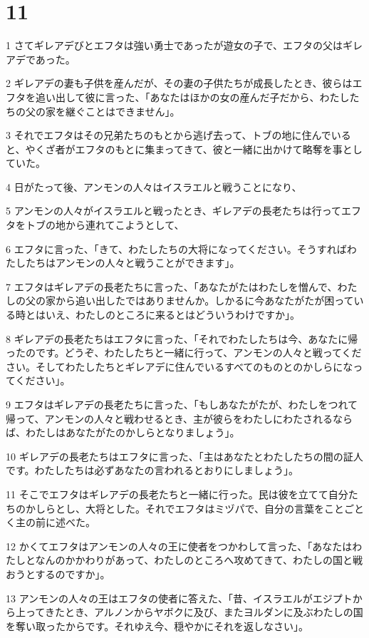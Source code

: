 \chapter{11}

\par 1 さてギレアデびとエフタは強い勇士であったが遊女の子で、エフタの父はギレアデであった。
\par 2 ギレアデの妻も子供を産んだが、その妻の子供たちが成長したとき、彼らはエフタを追い出して彼に言った、「あなたはほかの女の産んだ子だから、わたしたちの父の家を継ぐことはできません」。
\par 3 それでエフタはその兄弟たちのもとから逃げ去って、トブの地に住んでいると、やくざ者がエフタのもとに集まってきて、彼と一緒に出かけて略奪を事としていた。
\par 4 日がたって後、アンモンの人々はイスラエルと戦うことになり、
\par 5 アンモンの人々がイスラエルと戦ったとき、ギレアデの長老たちは行ってエフタをトブの地から連れてこようとして、
\par 6 エフタに言った、「きて、わたしたちの大将になってください。そうすればわたしたちはアンモンの人々と戦うことができます」。
\par 7 エフタはギレアデの長老たちに言った、「あなたがたはわたしを憎んで、わたしの父の家から追い出したではありませんか。しかるに今あなたがたが困っている時とはいえ、わたしのところに来るとはどういうわけですか」。
\par 8 ギレアデの長老たちはエフタに言った、「それでわたしたちは今、あなたに帰ったのです。どうぞ、わたしたちと一緒に行って、アンモンの人々と戦ってください。そしてわたしたちとギレアデに住んでいるすべてのものとのかしらになってください」。
\par 9 エフタはギレアデの長老たちに言った、「もしあなたがたが、わたしをつれて帰って、アンモンの人々と戦わせるとき、主が彼らをわたしにわたされるならば、わたしはあなたがたのかしらとなりましょう」。
\par 10 ギレアデの長老たちはエフタに言った、「主はあなたとわたしたちの間の証人です。わたしたちは必ずあなたの言われるとおりにしましょう」。
\par 11 そこでエフタはギレアデの長老たちと一緒に行った。民は彼を立てて自分たちのかしらとし、大将とした。それでエフタはミヅパで、自分の言葉をことごとく主の前に述べた。
\par 12 かくてエフタはアンモンの人々の王に使者をつかわして言った、「あなたはわたしとなんのかかわりがあって、わたしのところへ攻めてきて、わたしの国と戦おうとするのですか」。
\par 13 アンモンの人々の王はエフタの使者に答えた、「昔、イスラエルがエジプトから上ってきたとき、アルノンからヤボクに及び、またヨルダンに及ぶわたしの国を奪い取ったからです。それゆえ今、穏やかにそれを返しなさい」。
